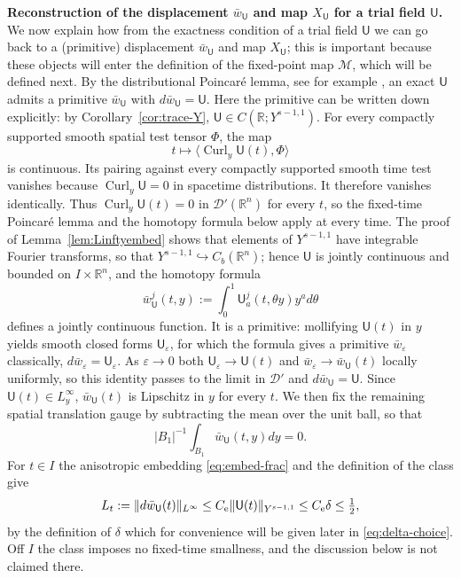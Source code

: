 \documentclass[11pt,reqno]{amsart}
\theoremstyle{plain}
\theoremstyle{definition}
\theoremstyle{remark}
\numberwithin{equation}{section}
\DeclareMathOperator{\Curl}{Curl}
\newcommand{\Ufield}{\mathsf U}
\newcommand{\Real}{\mathbb R}
\newcommand{\Rn}{\Real^n}
\begin{document}
\textbf{Reconstruction of the displacement $\bar w_\Ufield$ and map $X_\Ufield$ for a trial field $\Ufield$.} We now explain how from the exactness condition of a trial field $\Ufield$ we can go back to a (primitive) displacement $\bar w_\Ufield$ and map $X_\Ufield$; this is important because these objects will enter the definition of the fixed-point map $\mathcal{M}$, which will be defined next.  By the distributional Poincar\'e
lemma, see for example
\cite[Theorem~2.1]{Mardare2008}, an exact $\Ufield$ admits a primitive
$\bar w_{\Ufield}$ with $d\bar w_{\Ufield}=\Ufield$.  Here the primitive can
be written down explicitly: by Corollary~\ref{cor:trace-Y},
$\Ufield\in C(\Real;Y^{s-1,1})$. For every compactly supported smooth spatial
test tensor $\Phi$, the map
\[
 t\longmapsto\langle\Curl_y\Ufield(t),\Phi\rangle
\]
is continuous. Its pairing against every compactly supported smooth time test
vanishes because $\Curl_y\Ufield=0$ in spacetime distributions. It therefore
vanishes identically. Thus $\Curl_y\Ufield(t)=0$ in $\mathcal D'(\Rn)$ for
every $t$, so the fixed-time Poincar\'e lemma and the homotopy formula below
apply at every time. The proof of
Lemma~\ref{lem:Linftyembed} shows that elements of $Y^{s-1,1}$ have integrable
Fourier transforms, so that $Y^{s-1,1}\hookrightarrow C_b(\Rn)$; hence
$\Ufield$ is jointly continuous and bounded on $I\times\Rn$, and the homotopy
formula
\[
 \bar w_{\Ufield}^{ j}(t,y):=\int_0^1\Ufield_a^j(t,\theta y) y^a d\theta
\]
defines a jointly continuous function.  It is a primitive: mollifying
$\Ufield(t)$ in $y$ yields smooth closed forms $\Ufield_\varepsilon$, for which
the formula gives a primitive $\bar w_\varepsilon$ classically,
$d\bar w_\varepsilon=\Ufield_\varepsilon$.  As $\varepsilon\to0$ both
$\Ufield_\varepsilon\to\Ufield(t)$ and $\bar w_\varepsilon\to\bar
w_{\Ufield}(t)$ locally uniformly, so this identity passes to the limit in
$\mathcal D'$ and $d\bar w_{\Ufield}=\Ufield$.  Since $\Ufield(t)\in L^\infty_y$,
$\bar w_{\Ufield}(t)$ is Lipschitz in $y$ for every $t$.
We then fix the remaining spatial translation gauge by subtracting the mean over the
unit ball, so that
\[
 |B_1|^{-1}\int_{B_1}\bar w_{\Ufield}(t,y) dy=0.
\]
For $t\in I$ the anisotropic embedding \eqref{eq:embed-frac} and the definition
of the class give
\[
 L_t:=\|d\bar w_{\Ufield}(t)\|_{L^\infty}
 \le C_{\rm e}\|\Ufield(t)\|_{Y^{s-1,1}}\le C_{\rm e}\delta\le\tfrac12,
\]
by the definition of $\delta$ which for convenience will be given later in \eqref{eq:delta-choice}.  Off $I$ the class imposes no
fixed-time smallness, and the discussion below is not claimed there.
\end{document}

